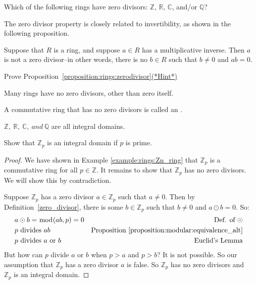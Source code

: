 \begin{exercise}
Which of the following rings have zero divisors: $\mathbb{Z}$, $\mathbb{R}$, $\mathbb{C}$, and/or $\mathbb{Q}$?
\end{exercise}

The zero divisor property is closely related to invertibility, as shown in the following proposition.

\begin{prop}\label{proposition:rings:zerodivisor}
Suppose that $R$ is a ring, and suppose $a \in R$ has a multiplicative inverse. Then $a$ is not a zero divisor--in other words, there is no $b \in R$ such that $b\neq 0$ and $a   b = 0$.
\end{prop}

\begin{exercise}\label{exercise:rings:zerodivisor}
Prove Proposition~\ref{proposition:rings:zerodivisor}\hyperref[ringsHints]{(*Hint*)} 
\end{exercise}

Many rings have no zero divisors, other than zero itself.

\begin{defn}\label{int_dom}
A commutative ring that has no zero divisors is called an .
\end{defn}

${\mathbb Z},~{\mathbb R},~{\mathbb C},~and~{\mathbb Q}$ are all integral domains.

\begin{example}\label{example:rings:integral_domain}
Show that ${\mathbb Z}_p$ is an integral domain if $p$ is prime.

\begin{proof}
We have shown in Example \ref{example:rings:Zn_ring} that ${\mathbb Z}_p$ is a commutative ring for all $p\in{\mathbb Z}$.  It remains to show that ${\mathbb Z}_p$ has no zero divisors.  We will show this by contradiction.

Suppose ${\mathbb Z}_p$ has a zero divisor $a\in{\mathbb Z}_p$ such that $a\neq 0$.  Then by Definition~\ref{zero_divisor}, there is some $b\in{\mathbb Z}_p$ such that $b\neq 0$ and $a\odot b=0$.  So:
\begin{align*}
&a\odot b=\bmod(ab,p)=0 & \text{Def. of }\odot\\
&p \text{ divides } ab & \text{Proposition }\ref{proposition:modular:equivalence_alt}\\
&p \text{ divides } a \text{ or } b & \text{Euclid's Lemma}\\
\end{align*}
But how can $p$ divide $a$ or $b$ when $p>a$ and $p>b$?  It is not possible.  So our assumption that ${\mathbb Z}_p$ has a zero divisor $a$ is false.  So ${\mathbb Z}_p$ has no zero divisors and ${\mathbb Z}_p$ is an integral domain.
\end{proof}
\end{example}

